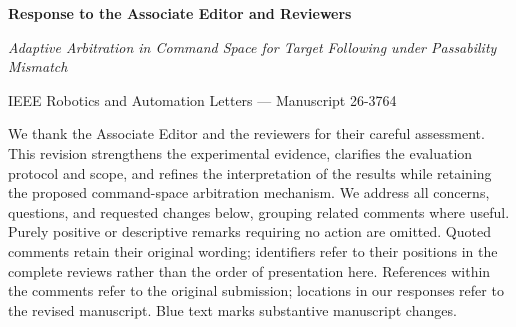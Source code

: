 \documentclass[letterpaper,11pt]{article}
\begin{document}
\begin{center}
{\Large\bfseries Response to the Associate Editor and Reviewers}\par
{\normalsize\itshape Adaptive Arbitration in Command Space for Target Following under Passability Mismatch}\par
{\small IEEE Robotics and Automation Letters --- Manuscript 26-3764}\par
\end{center}
We thank the Associate Editor and the reviewers for their careful assessment. This revision strengthens the experimental evidence, clarifies the evaluation protocol and scope, and refines the interpretation of the results while retaining the proposed command-space arbitration mechanism. We address all concerns, questions, and requested changes below, grouping related comments where useful. Purely positive or descriptive remarks requiring no action are omitted. Quoted comments retain their original wording; identifiers refer to their positions in the complete reviews rather than the order of presentation here. References within the comments refer to the original submission; locations in our responses refer to the revised manuscript. Blue text marks substantive manuscript changes.

\end{document}
